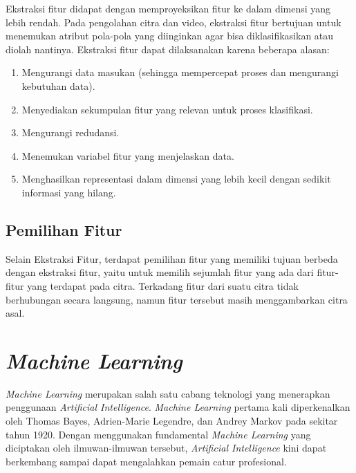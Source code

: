 
  Ekstraksi fitur didapat dengan memproyeksikan fitur ke dalam dimensi yang lebih rendah.
  Pada pengolahan citra dan video, ekstraksi fitur bertujuan untuk menemukan atribut pola-pola yang diinginkan agar bisa diklasifikasikan atau diolah nantinya.
  Ekstraksi fitur dapat dilaksanakan karena beberapa alasan:

    \begin{enumerate}[nolistsep]
      
      \item Mengurangi data masukan (sehingga mempercepat proses dan mengurangi kebutuhan data).

      \item Menyediakan sekumpulan fitur yang relevan untuk proses klasifikasi.

      \item Mengurangi redudansi.

      \item Menemukan variabel fitur yang menjelaskan data.

      \item Menghasilkan representasi dalam dimensi yang lebih kecil dengan sedikit informasi yang hilang.

    \end{enumerate}

  \subsection{Pemilihan Fitur}

  Selain Ekstraksi Fitur, terdapat pemilihan fitur yang memiliki tujuan berbeda dengan ekstraksi fitur, yaitu untuk memilih sejumlah fitur yang ada dari fitur-fitur yang terdapat pada citra.
  Terkadang fitur dari suatu citra tidak berhubungan secara langsung, namun fitur tersebut masih menggambarkan citra asal.

\section{\textit{Machine Learning}}
\textit{Machine Learning} merupakan salah satu cabang teknologi yang menerapkan penggunaan \textit{Artificial Intelligence}.
\textit{Machine Learning} pertama kali diperkenalkan oleh Thomas Bayes, Adrien-Marie Legendre, dan Andrey Markov pada sekitar tahun 1920.
Dengan menggunakan fundamental \textit{Machine Learning} yang diciptakan oleh ilmuwan-ilmuwan tersebut, \textit{Artificial Intelligence} kini dapat berkembang sampai dapat mengalahkan pemain catur profesional.


